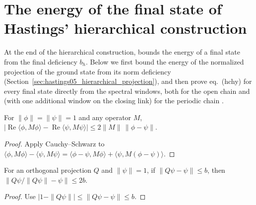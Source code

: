\section{The energy of the final state of Hastings' hierarchical construction}
\label{sec:hastings05_hierarchical_energy}


At the end of the hierarchical construction,
\cite[eq.~(hchy), lines 709--720]{Hastings2006Solving} bounds the energy of a
final state from the final deficiency $b_h$. Below we first bound the energy of
the normalized projection of the ground state from its norm deficiency
(Section~\ref{sec:hastings05_hierarchical_projection}), and then prove
eq.~(hchy) for every final state directly from the spectral windows, both for
the open chain and (with one additional window on the closing link) for the
periodic chain \cite{gap:hastings05_hierarchical_energy}.

\begin{lemma}
    \label{thm:hastings05_energy_nearby}
    \leanok
    For $\|\phi\|=\|\psi\|=1$ and any operator $M$,
    $|\operatorname{Re}\langle\phi,M\phi\rangle-\operatorname{Re}\langle\psi,M\psi\rangle|
        \le2\|M\|\,\|\phi-\psi\|$.
\end{lemma}
\begin{proof}
    \leanok
    Apply Cauchy--Schwarz to
    $\langle\phi,M\phi\rangle-\langle\psi,M\psi\rangle
        =\langle\phi-\psi,M\phi\rangle+\langle\psi,M(\phi-\psi)\rangle$.
\end{proof}

\begin{lemma}
    \label{thm:hastings05_normalization_one}
    \leanok
    For an orthogonal projection $Q$ and $\|\psi\|=1$, if
    $\|Q\psi-\psi\|\le b$, then $\|Q\psi/\|Q\psi\|-\psi\|\le2b$.
\end{lemma}
\begin{proof}
    \leanok
    Use $|1-\|Q\psi\||\le\|Q\psi-\psi\|\le b$.
\end{proof}

